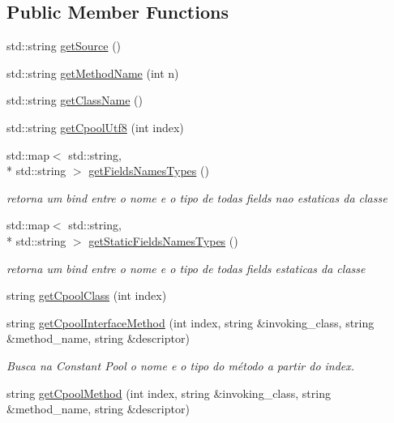\subsection*{Public Member Functions}
\begin{DoxyCompactItemize}
\item 
std\+::string \hyperlink{classClassFile_a327e97890dd251532d064da9aa61deeb}{get\+Source} ()
\item 
std\+::string \hyperlink{classClassFile_a61a0d04342247e9247faf26808b0c300}{get\+Method\+Name} (int n)
\item 
std\+::string \hyperlink{classClassFile_a325315e2b9ccf9c10955467aae82b2a1}{get\+Class\+Name} ()
\item 
std\+::string \hyperlink{classClassFile_a917fdac173079a7eebacb22b728f295d}{get\+Cpool\+Utf8} (int index)
\item 
std\+::map$<$ std\+::string, \\*
std\+::string $>$ \hyperlink{classClassFile_aa791a7b86ab130ba6ba28d6d71f2c70c}{get\+Fields\+Names\+Types} ()
\begin{DoxyCompactList}\small\item\em retorna um bind entre o nome e o tipo de todas fields nao estaticas da classe \end{DoxyCompactList}\item 
std\+::map$<$ std\+::string, \\*
std\+::string $>$ \hyperlink{classClassFile_ad63127cb4ef56f97cffc2cb875a1d144}{get\+Static\+Fields\+Names\+Types} ()
\begin{DoxyCompactList}\small\item\em retorna um bind entre o nome e o tipo de todas fields estaticas da classe \end{DoxyCompactList}\item 
string \hyperlink{classClassFile_a5fc6d3752ad2616f5e7bcb8402e93c7a}{get\+Cpool\+Class} (int index)
\item 
string \hyperlink{classClassFile_a711585f42e46f1e854d696f9189dfa1a}{get\+Cpool\+Interface\+Method} (int index, string \&invoking\+\_\+class, string \&method\+\_\+name, string \&descriptor)
\begin{DoxyCompactList}\small\item\em Busca na Constant Pool o nome e o tipo do método a partir do index. \end{DoxyCompactList}\item 
string \hyperlink{classClassFile_ae9258a6814dde7cf8e0be3f3c6533fa1}{get\+Cpool\+Method} (int index, string \&invoking\+\_\+class, string \&method\+\_\+name, string \&descriptor)

\end{DoxyCompactItemize}
